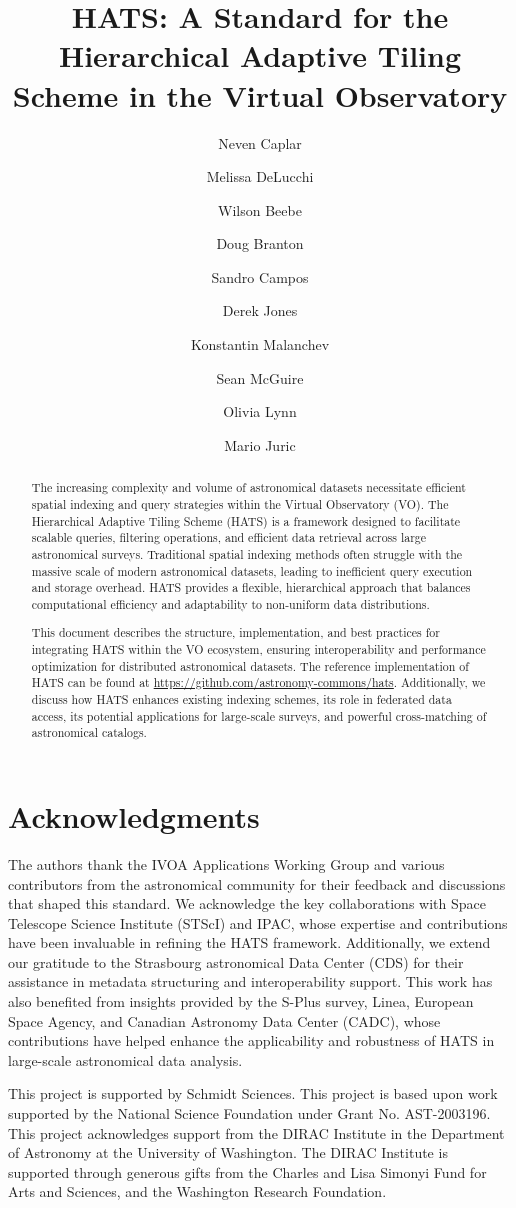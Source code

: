 \documentclass[11pt,a4paper]{ivoa}
\title{HATS: A Standard for the Hierarchical Adaptive Tiling Scheme in the Virtual Observatory}
\author[https://www.ivoa.net/authors/caplar]{Neven Caplar}
\author[https://www.ivoa.net/authors/delucchi]{Melissa DeLucchi}
\author[https://www.ivoa.net/authors/beebe]{Wilson Beebe}
\author[https://www.ivoa.net/authors/branton]{Doug Branton}
\author[https://www.ivoa.net/authors/campos]{Sandro Campos}
\author[https://www.ivoa.net/authors/jones]{Derek Jones}
\author[https://www.ivoa.net/authors/malanchev]{Konstantin Malanchev}
\author[https://www.ivoa.net/authors/mcguire]{Sean McGuire}
\author[https://www.ivoa.net/authors/lynn]{Olivia Lynn}
\author[https://www.ivoa.net/authors/juric]{Mario Juric}
\begin{document}
\begin{abstract}
The increasing complexity and volume of astronomical datasets necessitate efficient spatial indexing and query strategies within the Virtual Observatory (VO). 
The Hierarchical Adaptive Tiling Scheme (HATS) is a framework designed to facilitate scalable queries, filtering operations, and efficient data retrieval across large astronomical surveys. 
Traditional spatial indexing methods often struggle with the massive scale of modern astronomical datasets, leading to inefficient query execution and storage overhead. 
HATS provides a flexible, hierarchical approach that balances computational efficiency and adaptability to non-uniform data distributions.\par

This document describes the structure, implementation, and best practices for integrating HATS within the VO ecosystem, ensuring interoperability and performance optimization for distributed astronomical datasets. 
The reference implementation of HATS can be found at \url{https://github.com/astronomy-commons/hats}. 
Additionally, we discuss how HATS enhances existing indexing schemes, its role in federated data access, its potential applications for large-scale surveys, and powerful cross-matching of astronomical catalogs.


\end{abstract}

\section*{Acknowledgments}
The authors thank the IVOA Applications Working Group and various contributors from the astronomical community for their feedback and discussions that shaped this standard. 
We acknowledge the key collaborations with Space Telescope Science Institute (STScI) and IPAC, whose expertise and contributions have been invaluable in refining the HATS framework. 
Additionally, we extend our gratitude to  the Strasbourg astronomical Data Center (CDS) for their assistance in metadata structuring and interoperability support. 
This work has also benefited from insights provided by the S-Plus survey, Linea, European Space Agency, and Canadian Astronomy Data Center (CADC), whose contributions have helped enhance the applicability and robustness of HATS in large-scale astronomical data analysis. \par

This project is supported by Schmidt Sciences.
This project is based upon work supported by the National Science Foundation under Grant No. AST-2003196.
This project acknowledges support from the DIRAC Institute in the Department of Astronomy at the University of Washington. The DIRAC Institute is supported through generous gifts from the Charles and Lisa Simonyi Fund for Arts and Sciences, and the Washington Research Foundation.
\end{document}

